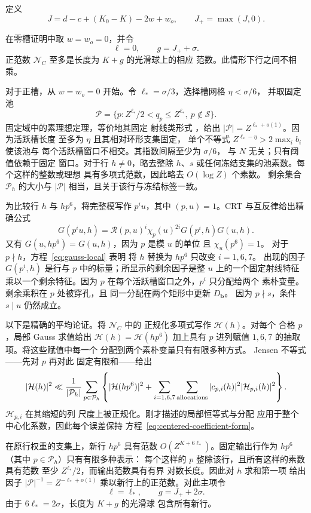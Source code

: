\documentclass[11pt,a4paper]{article}
\numberwithin{equation}{section}
\numberwithin{figure}{section}
\theoremstyle{definition}
\theoremstyle{remark}
\begin{document}
定义
\begin{equation}
 J=d-c+(K_0-K)-2w+w_o,\qquad J_+=\max(J,0).
 \label{old-eq:2.8}
\end{equation}

在零槽证明中取 \(w=w_o=0\)，并令
\[
 \ell=0,\qquad g=J_++\sigma.
\]
正范数 \(\mathcal N_C\) 至多是长度为 \(K+g\) 的光滑球上的相应
范数。此情形下行之间不相乘。

对于正槽，从 \(w=w_o=0\) 开始。令
\(\ell_*=\sigma/3\)，选择槽网格 \(\eta<\sigma/6\)，
并取固定池
\[
 \mathcal P=\{p: Z^{\ell_*}/2<q_p\le Z^{\ell_*},\
                    p\notin\mathcal S\}.
\]
固定域中的素理想定理，等价地其固定
射线类形式 \cite[定理 1.1]{TZ}，给出
\(|\mathcal P|=Z^{\ell_*+o(1)}\)。因为活跃槽长度
至多为 \(\eta\) 且其相对环形支集固定，
单个不等式
\(Z^{\ell_*-\eta}>2\max_i b_i\) 使该池与
每个活跃槽窗口不相交。其指数间隔至少为 \(\sigma/6\)，
与 \(N\) 无关；只有阈值依赖于固定
窗口。对于行 \(h\ne0\)，略去整除
\(h\)、\(s\) 或任何冻结支集的池素数。每个这样的整数或理想
具有多项式范数，因此略去 \(O(\log Z)\) 个素数。
剩余集合 \(\mathcal P_h\) 的大小与
\(|\mathcal P|\) 相当，且关于该行与冻结标签一致。

为比较行 \(h\) 与 \(hp^6\)，将完整模写作 \(p^iu\)，其中
\((p,u)=1\)。CRT 与互反律给出精确公式
\[
 G(p^iu,h)
 =\mathcal R(p,u)^i\chi_p(u)^{2i}G(p^i,h)G(u,h).
\]
又有 \(G(u,hp^6)=G(u,h)\)，因为 \(p\) 是模 \(u\) 的单位
且 \(\chi_u(p^6)=1\)。
对于 \(p\nmid h\)，方程~\eqref{eq:gauss-local} 表明
将 \(h\) 替换为 \(hp^6\) 只改变 \(i=1,6,7\)。
出现的因子 \(G(p^i,h)\) 是行与
\(p\) 中的标量；所显示的剩余因子是整 \(u\) 上的一个固定射线特征
乘以一个剩余特征。因为 \(p\)
在每个活跃槽窗口之外，\(p^i\) 只分配给两个
素朴变量。剩余乘积在 \(p\) 处被穿孔，且
同一分配在两个矩形中更新 \(D_{\mathbf b}\)。
因为 \(p\nmid s\)，条件 \(s\mid u\) 仍然成立。

以下是精确的平均论证。将 \(\mathcal N_C\) 中的
正规化多项式写作 \(\mathcal H(h)\)。对每个
合格 \(p\)，局部 Gauss 求值给出
\(\mathcal H(h)=\mathcal H(hp^6)\) 加上具有
\(p\) 进列赋值 \(1,6,7\) 的抽取项。将这些赋值中每一个
分配到两个素朴变量只有有限多种方式。
Jensen 不等式——先对 \(p\) 再对此
固定有限和——给出
\[
 |\mathcal H(h)|^2\ll
 \frac1{|\mathcal P_h|}\sum_{p\in\mathcal P_h}
 \left\{|\mathcal H(hp^6)|^2+
        \sum_{i=1,6,7}\sum_{\rm allocations}
        |c_{p,i}(h)|^2|\mathcal H_{p,i}(h)|^2\right\}.
\]
\(\mathcal H_{p,i}\) 在其缩短的列
尺度上被正规化。刚才描述的局部恒等式与分配
应用于整个中心化系数，因此每个误差保持
方程~\eqref{eq:centered-coefficient-form}。

在原行权重的支集上，新行 \(hp^6\)
具有范数 \(O(Z^{K+6\ell_*})\)。固定输出行作为
\(hp^6\)（其中 \(p\in\mathcal P_h\)）只有有限多种表示：
每个这样的 \(p\) 整除该行，且所有这样的素数具有范数
至少 \(Z^{\ell_*}/2\)，而输出范数具有有界
对数长度。因此对 \(h\) 求和第一项
给出因子 \(|\mathcal P|^{-1}=Z^{-\ell_*+o(1)}\)
乘以新行上的正范数。对此主项令
\[
 \ell=\ell_*,\qquad g=J_++2\sigma.
\]
由于 \(6\ell_*=2\sigma\)，长度为 \(K+g\) 的光滑球
包含所有新行。
\end{document}

